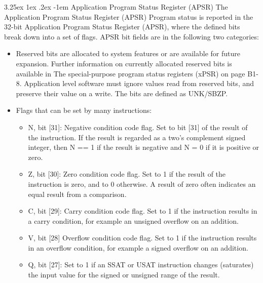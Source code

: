 \documentclass{report}
\makeatletter
\renewcommand\paragraph{\@startsection{paragraph}{5}{\z@}%
	{3.25ex \@plus1ex \@minus.2ex}%
	{-1em}%
	{\normalfont\normalsize\bfseries}}
\makeatother
\begin{document}
		\paragraph{Application Program Status Register (APSR)} The Application Program Status Register (APSR) Program status is reported in the 32-bit Application Program Status Register (APSR), where the defined bits break down into a set of flags.
		APSR bit fields are in the following two categories:
		\begin{itemize}
			\item Reserved bits are allocated to system features or are available for future expansion. Further information on currently allocated reserved bits is available in The special-purpose program status registers (xPSR) on page B1-8. Application level software must ignore values read from reserved bits, and preserve their value on a write. The bits are defined as UNK/SBZP.
			\item Flags that can be set by many instructions:
			\begin{itemize}
				\item N, bit [31]: Negative condition code flag. Set to bit [31] of the result of the instruction. If the result is regarded as a two's complement signed integer, then N == 1 if the result is negative and N = 0 if it is positive or zero.
				\item Z, bit [30]: Zero condition code flag. Set to 1 if the result of the instruction is zero, and to 0 otherwise.
				A result of zero often indicates an equal result from a comparison.
				\item C, bit [29]: Carry condition code flag. Set to 1 if the instruction results in a carry condition, for
				example an unsigned overflow on an addition.
				\item V, bit [28] Overflow condition code flag. Set to 1 if the instruction results in an overflow condition,		for example a signed overflow on an addition.
				\item Q, bit [27]: Set to 1 if an SSAT or USAT instruction changes (saturates) the input value for the signed or unsigned range of the result.
			\end{itemize}
		\end{itemize}
			
\end{document}
